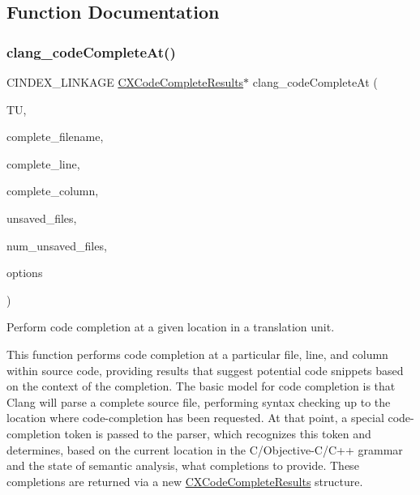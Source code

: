 \subsection{Function Documentation}
\mbox{\label{group__CINDEX__CODE__COMPLET_ga50fedfa85d8d1517363952f2e10aa3bf}} 
\subsubsection{\texorpdfstring{clang\+\_\+code\+Complete\+At()}{clang\_codeCompleteAt()}}
{\footnotesize\ttfamily C\+I\+N\+D\+E\+X\+\_\+\+L\+I\+N\+K\+A\+GE \mbox{\hyperlink{structCXCodeCompleteResults}{C\+X\+Code\+Complete\+Results}}$\ast$ clang\+\_\+code\+Complete\+At (\begin{DoxyParamCaption}\item[{\mbox{\hyperlink{group__CINDEX_gacdb7815736ca709ce9a5e1ec2b7e16ac}{C\+X\+Translation\+Unit}}}]{TU,  }\item[{const char $\ast$}]{complete\+\_\+filename,  }\item[{unsigned}]{complete\+\_\+line,  }\item[{unsigned}]{complete\+\_\+column,  }\item[{struct \mbox{\hyperlink{structCXUnsavedFile}{C\+X\+Unsaved\+File}} $\ast$}]{unsaved\+\_\+files,  }\item[{unsigned}]{num\+\_\+unsaved\+\_\+files,  }\item[{unsigned}]{options }\end{DoxyParamCaption})}



Perform code completion at a given location in a translation unit. 

This function performs code completion at a particular file, line, and column within source code, providing results that suggest potential code snippets based on the context of the completion. The basic model for code completion is that Clang will parse a complete source file, performing syntax checking up to the location where code-\/completion has been requested. At that point, a special code-\/completion token is passed to the parser, which recognizes this token and determines, based on the current location in the C/\+Objective-\/\+C/\+C++ grammar and the state of semantic analysis, what completions to provide. These completions are returned via a new {\ttfamily \mbox{\hyperlink{structCXCodeCompleteResults}{C\+X\+Code\+Complete\+Results}}} structure.

